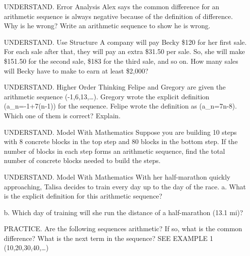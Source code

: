 \documentclass{article}
\newenvironment{practice}[2]{}{}        %
\newcommand{\answer}[1]{}               %
\newcommand{\placeholder}[2]{}          %
\begin{document}
\begin{practice}{13}{2}
UNDERSTAND. Error Analysis Alex says the common difference for an arithmetic sequence is always negative because of the definition of difference. Why is he wrong? Write an arithmetic sequence to show he is wrong.
\answer{The common difference is the constant change between consecutive terms in an arithmetic sequence. Sample: In the arithmetic sequence (2,4,6,8,\ldots), the common difference is a positive 2.}
\end{practice}
\begin{practice}{14}{2}
UNDERSTAND. Use Structure A company will pay Becky \$120 for her first sale. For each sale after that, they will pay an extra \$31.50 per sale. So, she will make \$151.50 for the second sale, \$183 for the third sale, and so on. How many sales will Becky have to make to earn at least \$2,000?
\answer{at least 9 sales}
\end{practice}
\begin{practice}{15}{3}
UNDERSTAND. Higher Order Thinking Felipe and Gregory are given the arithmetic sequence (-1,6,13,\ldots). Gregory wrote the explicit definition (a_n=-1+7(n-1)) for the sequence. Felipe wrote the definition as (a_n=7n-8). Which one of them is correct? Explain.
\answer{Both; Gregory's formula can be simplified to get Felipe's formula.}
\end{practice}
\begin{practice}{16}{2}
UNDERSTAND. Model With Mathematics Suppose you are building 10 steps with 8 concrete blocks in the top step and 80 blocks in the bottom step. If the number of blocks in each step forms an arithmetic sequence, find the total number of concrete blocks needed to build the steps.
\answer{440}
\end{practice}
\begin{practice}{17}{2}
UNDERSTAND. Model With Mathematics With her half-marathon quickly approaching, Talisa decides to train every day up to the day of the race.
a. What is the explicit definition for this arithmetic sequence?
\answer{(a_n=2+0.3(n-1))}
b. Which day of training will she run the distance of a half-marathon (13.1 mi)?
\answer{day 38}
\placeholder{illustration}{Runner on a gray path through green grass with city skyline. Pathside DAY scale labeled 1,2,3,4,5; sign 2 mi at day 1 and sign 3.2 mi at day 5.}
\end{practice}
\begin{practice}{18}{1}
PRACTICE. Are the following sequences arithmetic? If so, what is the common difference? What is the next term in the sequence? SEE EXAMPLE 1
(10,20,30,40,\ldots)
\answer{yes; 10; 50}
\end{practice}
\end{document}
